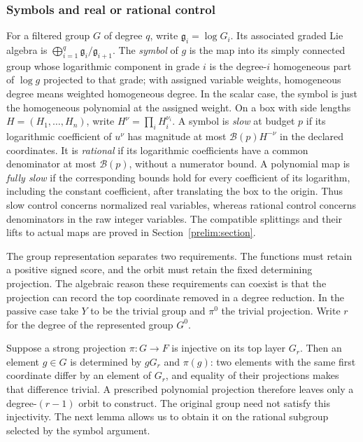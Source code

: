 \subsubsection{Symbols and real or rational control}\label{ap:symbol-conventions}
For a filtered group $G$ of degree $q$, write
$\mathfrak g_i=\log G_i$.  Its associated graded Lie algebra is
$\bigoplus_{i=1}^q\mathfrak g_i/\mathfrak g_{i+1}$.
The \emph{symbol} of $g$ is the map into its simply connected group
whose logarithmic component in grade $i$ is the degree-$i$
homogeneous part of $\log g$ projected to that grade; with assigned
variable weights, homogeneous degree means weighted homogeneous
degree. In the scalar
case, the symbol is just the homogeneous polynomial at the assigned
weight.
On a box with side lengths $H=(H_1,\ldots,H_n)$, write
$H^\nu=\prod_iH_i^{\nu_i}$. A symbol is \emph{slow} at budget
$p$ if its logarithmic coefficient of $u^\nu$ has magnitude at most
$\mathcal B(p)H^{-\nu}$ in the declared coordinates. It is
\emph{rational} if its logarithmic coefficients have a common
denominator at most $\mathcal B(p)$, without a numerator bound.
A polynomial map is \emph{fully slow} if the corresponding bounds
hold for every coefficient of its logarithm, including the constant
coefficient, after translating the box to the origin.
Thus slow control concerns normalized real variables, whereas
rational control concerns denominators in the raw integer variables.
The compatible splittings and their lifts to actual maps are proved
in Section~\ref{prelim:section}.

The group representation separates two requirements.  The functions
must retain a positive signed score, and the orbit must retain the
fixed determining projection.  The algebraic reason these requirements
can coexist is that the projection can record the top coordinate
removed in a degree reduction.
In the passive case take $Y$ to be the trivial group and $\pi^0$
the trivial projection.  Write $r$ for the degree of the represented
group $G^0$.

Suppose a strong projection $\pi:G\to F$ is injective on its top
layer $G_r$.  Then an element $g\in G$ is determined by
$gG_r$ and $\pi(g)$: two elements with the same first coordinate
differ by an element of $G_r$, and equality of their projections
makes that difference trivial.  A prescribed polynomial projection
therefore leaves only a degree-$(r-1)$ orbit to construct.  The
original group need not satisfy this injectivity.  The next lemma
allows us to obtain it on the rational subgroup selected by the
symbol argument.

